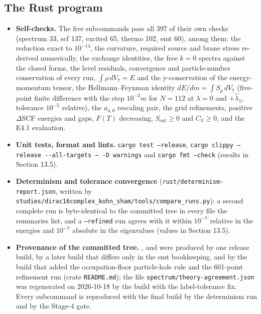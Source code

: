 \documentclass[11pt]{article}
\begin{document}
\subsection{The Rust program}

\begin{itemize}
\item \textbf{Self-checks.} The five subcommands pass all 397 of their own checks (spectrum 33, scf 137, excited 65, thermo 102, emt 60), among them: the reduction exact to $10^{-14}$, the curvature, required source and brane stress re-derived numerically, the exchange identities, the free $k=0$ spectra against the closed forms, the level residuals, convergence and particle-number conservation of every run, $\int\rho\,dV_7=E$ and the y-conservation of the energy-momentum tensor, the Hellmann--Feynman identity $dE/dm=\int S_p\,dV_7$ (five-point finite difference with the step $10^{-3}m$ for $N=112$ at $\lambda=0$ and $+\hat\lambda_1$, tolerance $10^{-5}$ relative), the $a_{4,0}$ rescaling pair, the grid refinements, positive $\Delta$SCF energies and gaps, $F(T)$ decreasing, $S_{\mathrm{ent}}\ge0$ and $C_V\ge0$, and the E4.1 evaluation.
\item \textbf{Unit tests, format and lints.} \texttt{cargo te\allowbreak{}st --rel\allowbreak{}ease}, \texttt{cargo cl\allowbreak{}ippy --r\allowbreak{}elease -\allowbreak{}-all-tar\allowbreak{}gets -- \allowbreak{}-D warni\allowbreak{}ngs} and \texttt{cargo fm\allowbreak{}t --chec\allowbreak{}k} (results in Section 13.5).
\item \textbf{Determinism and tolerance convergence} (\texttt{rust/det\allowbreak{}erminism\allowbreak{}-report.\allowbreak{}json}, written by \texttt{studies/\allowbreak{}dirac16c\allowbreak{}omplex\_k\allowbreak{}ohn\_sham\allowbreak{}/tools/c\allowbreak{}ompare\_r\allowbreak{}uns.py}): a second complete run is byte-identical to the committed tree in every file the summaries list, and a \texttt{--refine\allowbreak{}d} run agrees with it within $10^{-7}$ relative in the energies and $10^{-7}$ absolute in the eigenvalues (values in Section 13.5).
\item \textbf{Provenance of the committed tree.} \texttt{}, \texttt{} and \texttt{} were produced by one release build, \texttt{} by a later build that differs only in the emt bookkeeping, and \texttt{} by the build that added the occupation-floor particle-hole rule and the 601-point refinement run (crate \texttt{README.m\allowbreak{}d}); the file \texttt{spectrum\allowbreak{}/theory-\allowbreak{}agreemen\allowbreak{}t.json} was regenerated on 2026-10-18 by the build with the label-tolerance fix. Every subcommand is reproduced with the final build by the determinism run and by the Stage-4 gate.
\end{itemize}
\end{document}
